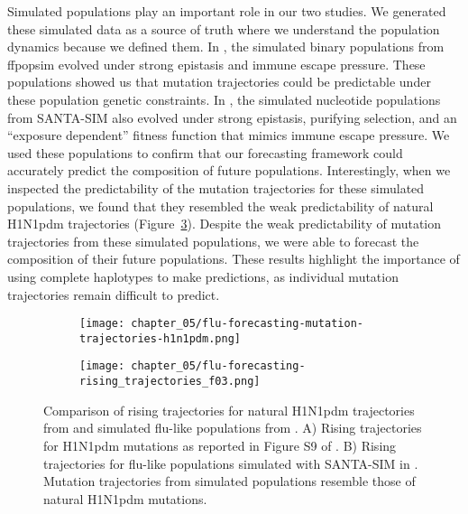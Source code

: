Simulated populations play an important role in our two studies.
We generated these simulated data as a source of truth where we understand the population dynamics because we defined them.
In \citet{Barrat-Charlaix2020}, the simulated binary populations from ffpopsim \citep{Zanini2012} evolved under strong epistasis and immune escape pressure.
These populations showed us that mutation trajectories could be predictable under these population genetic constraints.
In \citet{Huddleston2020}, the simulated nucleotide populations from SANTA-SIM \citep{Jariani2019} also evolved under strong epistasis, purifying selection, and an ``exposure dependent'' fitness function that mimics immune escape pressure.
We used these populations to confirm that our forecasting framework could accurately predict the composition of future populations.
Interestingly, when we inspected the predictability of the mutation trajectories for these simulated populations, we found that they resembled the weak predictability of natural H1N1pdm trajectories (Figure~\ref{fig:mutation-trajectories-comparison}).
Despite the weak predictability of mutation trajectories from these simulated populations, we were able to forecast the composition of their future populations.
These results highlight the importance of using complete haplotypes to make predictions, as individual mutation trajectories remain difficult to predict.

\begin{figure}
  \begin{subfigure}[b]{0.5\textwidth}
    \centering
    \texttt{[image: chapter\_05/flu-forecasting-mutation-trajectories-h1n1pdm.png]}
    \label{fig:mutation-trajectories-h1n1pdm}
  \end{subfigure}
  \hfill
  \begin{subfigure}[b]{0.4\textwidth}
    \centering
    \texttt{[image: chapter\_05/flu-forecasting-rising\_trajectories\_f03.png]}
    \label{fig:mutation-trajectories-simulated}
  \end{subfigure}

  \caption{Comparison of rising trajectories for natural H1N1pdm trajectories from \citet{Barrat-Charlaix2020} and simulated flu-like populations from \citet{Huddleston2020}.
    A) Rising trajectories for H1N1pdm mutations as reported in Figure S9 of \citet{Barrat-Charlaix2020}.
    B) Rising trajectories for flu-like populations simulated with SANTA-SIM in \citet{Huddleston2020}.
    Mutation trajectories from simulated populations resemble those of natural H1N1pdm mutations.\label{fig:mutation-trajectories-comparison}
  }
\end{figure}

